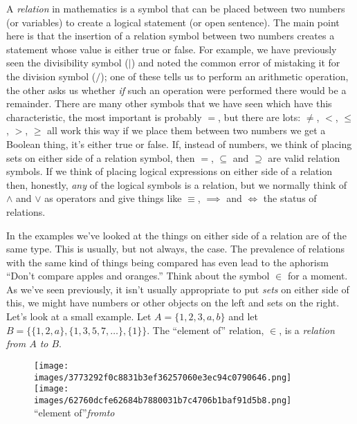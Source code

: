 \documentclass[10pt,]{book}
\theoremstyle{plain}
\theoremstyle{definition}
\theoremstyle{definition}
\numberwithin{equation}{section}
\newcommand{\lt}{ < }
\begin{document}
    A \emph{relation} in mathematics is a symbol that can be placed between
    two numbers (or variables) to create a logical statement (or open sentence).
    The main point here is that the insertion of a relation symbol between
    two numbers creates a statement whose value is either true or false.
    For example, we have previously seen the divisibility symbol (\(\mid\)) and noted
    the common error of mistaking it for the division symbol (\(/\)); one of these
    tells us to perform an arithmetic operation, the other asks us whether
    \emph{if} such an operation were performed there would be a remainder.
    There are many other symbols that we have seen which have this characteristic,
    the most important is probably \(=\), but there are lots: \(\neq\), \(\lt\), \(\leq\),
    \(>\), \(\geq\) all work this way \textemdash{} if we place them between two numbers
    we get a Boolean thing, it's either true or false. If, instead of numbers,
    we think of placing sets on either side of a relation symbol, then
    \(=\), \(\subseteq\) and \(\supseteq\) are valid relation symbols. If we think
    of placing logical expressions on either side of a relation then,
    honestly, \emph{any} of the logical symbols is a relation, but we normally
    think of \(\land\) and \(\lor\) as operators and give things like \(\equiv\),
    \(\implies\) and \(\iff\) the status of relations.
\par

    In the examples we've looked at the things on either side of a relation
    are of the same type. This is usually, but not always, the case. The
    prevalence of relations with the same kind of things being compared has
    even lead to the aphorism ``Don't compare apples and oranges.'' Think
    about the symbol \(\in\) for a moment. As we've seen previously, it
    isn't usually appropriate to put \emph{sets} on either side of this,
    we might have numbers or other objects on the left and sets on the right.
    Let's look at a small example. Let \(A = \{1,2,3,a,b\}\) and let
    \(B=\{ \{1,2,a\}, \{1,3,5,7,\ldots\}, \{1\} \}\). The ``element of''
    relation, \(\in\), is a \emph{relation from \(A\) to \(B\)}.
\leavevmode%
\begin{figure}
\centering
\texttt{[image: images/3773292f0c8831b3ef36257060e3ec94c0790646.png]}
\texttt{[image: images/62760dcfe62684b7880031b7c4706b1baf91d5b8.png]}
``element of''\emph{from}\emph{to}\end{figure}
\par
\end{document}
